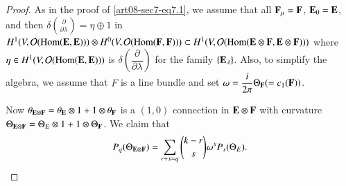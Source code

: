 \begin{proof}
As in the proof of \eqref{art08-sec7-eq7.1}, we assume that all $\mathbf{F}_{\mu}=\mathbf{F}$, $\mathbf{E}_{0}=\mathbf{E}$, and then $\delta\binom{\partial}{\partial \lambda}=\eta\oplus 1$ in $H^{1}(V,\mathcal{O}(\operatorname{\mathrm{Hom}}(\mathbf{E},\mathbf{E})))\otimes H^{0}(V,\mathcal{O}(\operatorname{\mathrm{Hom}}(\mathbf{F},\mathbf{F})))\subset H^{1}(V,\mathcal{O}(\operatorname{\mathrm{Hom}}(\mathbf{E}\otimes \mathbf{F},\mathbf{E}\otimes\mathbf{F})))$ where $\eta\in H^{1}(V,\mathcal{O}(\operatorname{\mathrm{Hom}}(\mathbf{E},\mathbf{E})))$ is $\delta\left(\dfrac{\partial}{\partial \lambda}\right)$ for the family $\{\mathbf{E}_{\lambda}\}$. Also, to simplify the algebra, we assume that $F$ is a line bundle and set $\omega=\dfrac{i}{2\pi}\Theta_{\mathbf{F}}(=c_{1}(\mathbf{F}))$.

Now $\theta_{\mathbf{E}\otimes \mathbf{F}}=\theta_{\mathbf{E}}\otimes 1+1\otimes \theta_{\mathbf{F}}$ is a $(1,0)$ connection in $\mathbf{E}\otimes \mathbf{F}$ with curvature $\Theta_{\mathbf{E}\otimes \mathbf{F}}=\Theta_{E}\otimes 1+1\otimes \Theta_{\mathbf{F}}$. We claim that
\begin{equation}
P_{q}(\Theta_{\mathbf{E}\otimes\mathbf{F}})=\sum\limits_{r+s=q}\binom{k-r}{s}\omega^{s}P_{s}(\Theta_{E}).\label{art08-sec7-eq7.8}
\end{equation}
\end{proof}

